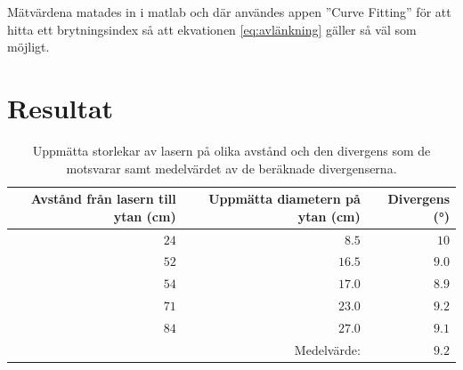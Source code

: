 \documentclass[a4paper]{article}
\begin{document}
  Mätvärdena matades in i matlab och där användes appen ”Curve Fitting” för att hitta ett brytningsindex så att ekvationen \eqref{eq:avlänkning} gäller så väl som möjligt.

\section{Resultat}

\FloatBarrier

\begin{table}[h]
	\centering
	\caption{Uppmätta storlekar av lasern på olika avstånd och den divergens som de motsvarar samt medelvärdet av de beräknade divergenserna.}
	\label{tab:div}
	\begin{tabular}{rrr}%
		\hline
		Avstånd från lasern till ytan (\si{\centi\meter}) & Uppmätta diametern på ytan (\si{\centi\meter}) & Divergens (\si{\degree}) \\
		\hline
		$24$ & $8.5$ & $10$ \\
		$52$ & $16.5$ & $9.0$ \\
		$54$ & $17.0$ & $8.9$ \\
		$71$ & $23.0$ & $9.2$ \\
		$84$ & $27.0$ & $9.1$ \\
		& Medelvärde: & $9.2$ \\
		\hline
	\end{tabular}
\end{table}
\end{document}
